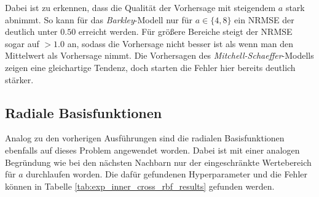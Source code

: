 Dabei ist zu erkennen, dass die Qualität der Vorhersage mit steigendem $a$ stark abnimmt. So kann für das \textit{Barkley}-Modell nur für $a \in \{4,8\}$ ein NRMSE der deutlich unter $0.50$ erreicht werden. Für größere Bereiche steigt der NRMSE sogar auf $> 1.0$ an, sodass die Vorhersage nicht besser ist als wenn man den Mittelwert als Vorhersage nimmt. Die Vorhersagen des \textit{Mitchell-Schaeffer}-Modells zeigen eine gleichartige Tendenz, doch starten die Fehler hier bereits deutlich stärker. 

\subsection{Radiale Basisfunktionen}
Analog zu den vorherigen Ausführungen sind die radialen Basisfunktionen ebenfalls auf dieses Problem angewendet worden. Dabei ist mit einer analogen Begründung wie bei den nächsten Nachbarn nur der eingeschränkte Wertebereich für $a$ durchlaufen worden. Die dafür gefundenen Hyperparameter und die Fehler können in Tabelle \ref{tab:exp_inner_cross_rbf_results} gefunden werden.
